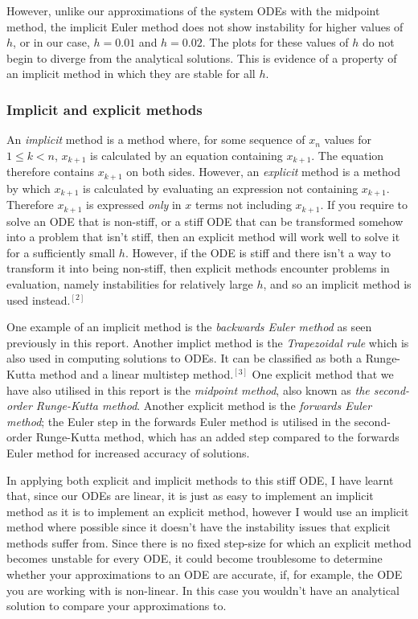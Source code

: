 \documentclass[11pt,a4paper]{article}
\begin{document}
However, unlike our approximations of the system ODEs with the midpoint method, the implicit Euler method does not show instability for higher values of $h$, or in our case, $h=0.01$ and $h=0.02$. The plots for these values of $h$ do not begin to diverge from the analytical solutions. This is evidence of a property of an implicit method in which they are stable for all $h$.

\subsubsection*{Implicit and explicit methods}
An \textit{implicit} method is a method where, for some sequence of $x_n$ values for $1\leq k < n$, $x_{k+1}$ is calculated by an equation containing $x_{k+1}$. The equation therefore contains $x_{k+1}$ on both sides. However, an \textit{explicit} method is a method by which $x_{k+1}$ is calculated by evaluating an expression not containing $x_{k+1}$. Therefore $x_{k+1}$ is expressed \textit{only} in $x$ terms not including $x_{k+1}$. 
If you require to solve an ODE that is non-stiff, or a stiff ODE that can be transformed somehow into a problem that isn't stiff, then an explicit method will work well to solve it for a sufficiently small $h$. However, if the ODE is stiff and there isn't a way to transform it into being non-stiff, then explicit methods encounter problems in evaluation, namely instabilities for relatively large $h$, and so an implicit method is used instead.$^{[2]}$ 

One example of an implicit method is the \textit{backwards Euler method} as seen previously in this report. Another implict method is the \textit{Trapezoidal rule} which is also used in computing solutions to ODEs. It can be classified as both a Runge-Kutta method and a linear multistep method.$^{[3]}$ One explicit method that we have also utilised in this report is the \textit{midpoint method}, also known as \textit{the second-order Runge-Kutta method}. Another explicit method is the \textit{forwards Euler method}; the Euler step in the forwards Euler method is utilised in the second-order Runge-Kutta method, which has an added step compared to the forwards Euler method for increased accuracy of solutions. 

In applying both explicit and implicit methods to this stiff ODE, I have learnt that, since our ODEs are linear, it is just as easy to implement an implicit method as it is to implement an explicit method, however I would use an implicit method where possible since it doesn't have the instability issues that explicit methods suffer from. Since there is no fixed step-size for which an explicit method becomes unstable for every ODE, it could become troublesome to determine whether your approximations to an ODE are accurate, if, for example, the ODE you are working with is non-linear. In this case you wouldn't have an analytical solution to compare your approximations to.
\end{document}
